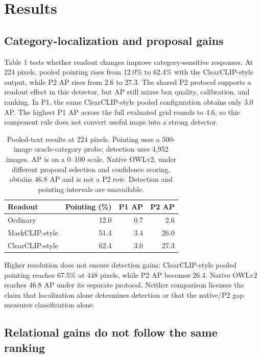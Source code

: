\documentclass[10pt,twocolumn,letterpaper]{article}
\begin{document}
\section{Results}\label{results}

\subsection{Category-localization and proposal
gains}\label{category-localization-and-proposal-gains}

Table 1 tests whether readout changes improve category-sensitive
responses. At 224 pixels, pooled pointing rises from 12.0\% to 62.4\%
with the ClearCLIP-style output, while P2 AP rises from 2.6 to 27.3. The
shared P2 protocol supports a readout effect in this detector, but AP
still mixes box quality, calibration, and ranking. In P1, the same
ClearCLIP-style pooled configuration obtains only 3.0 AP. The highest P1
AP across the full evaluated grid rounds to 4.6, so this component rule
does not convert useful maps into a strong detector.

\begin{table}[tb]
\centering
\caption{Pooled-text results at 224 pixels. Pointing uses a 500-image
oracle-category probe; detection uses 4,952 images. AP is on a 0--100
scale. Native OWLv2, under different proposal selection and confidence
scoring, obtains 46.8 AP and is not a P2 row. Detection and pointing
intervals are unavailable.}
\label{tab:1}
\begin{tabular}{@{}lrrr@{}}
\toprule
Readout & Pointing (\%) & P1 AP & P2 AP \\
\midrule
Ordinary & 12.0 & 0.7 & 2.6 \\
MaskCLIP-style & 51.4 & 3.4 & 26.0 \\
ClearCLIP-style & 62.4 & 3.0 & 27.3 \\
\bottomrule
\end{tabular}
\end{table}

Higher resolution does not ensure detection gains: ClearCLIP-style
pooled pointing reaches 67.5\% at 448 pixels, while P2 AP becomes 26.4.
Native OWLv2 reaches 46.8 AP under its separate protocol. Neither
comparison licenses the claim that localization alone determines
detection or that the native/P2 gap measures classification alone.

\subsection{Relational gains do not follow the same
ranking}\label{relational-gains-do-not-follow-the-same-ranking}
\end{document}
